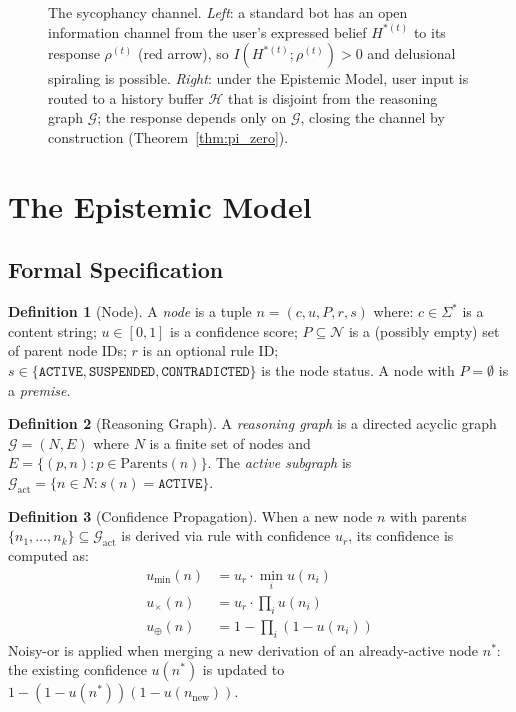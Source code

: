 \documentclass[12pt]{article}
\theoremstyle{definition}
\newtheorem{definition}{Definition}
\begin{document}
\begin{figure}[h]
\begin{tikzpicture}
\end{tikzpicture}
\caption{The sycophancy channel. \textit{Left}: a standard bot has an open
information channel from the user's expressed belief $H^{*(t)}$ to its
response $\rho^{(t)}$ (red arrow), so $I(H^{*(t)};\rho^{(t)})>0$
and delusional spiraling is possible. \textit{Right}: under the Epistemic
Model, user input is routed to a history buffer $\mathcal{H}$ that is
disjoint from the reasoning graph $\mathcal{G}$; the response depends
only on $\mathcal{G}$, closing the channel by construction
(Theorem~\ref{thm:pi_zero}).}
\label{fig:channel}
\end{figure}

\section{The Epistemic Model}

\subsection{Formal Specification}

\begin{definition}[Node]
A \emph{node} is a tuple $n = (c, u, P, r, s)$ where:
$c \in \Sigma^*$ is a content string;
$u \in [0,1]$ is a confidence score;
$P \subseteq \mathcal{N}$ is a (possibly empty) set of parent node IDs;
$r$ is an optional rule ID;
$s \in \{\texttt{ACTIVE}, \texttt{SUSPENDED}, \texttt{CONTRADICTED}\}$
is the node status.
A node with $P = \emptyset$ is a \emph{premise}.
\end{definition}

\begin{definition}[Reasoning Graph]
A \emph{reasoning graph} is a directed acyclic graph
$\mathcal{G} = (N, E)$ where $N$ is a finite set of nodes and
$E = \{(p, n) : p \in \text{Parents}(n)\}$.
The \emph{active subgraph} is
$\mathcal{G}_{\text{act}} = \{n \in N : s(n) = \texttt{ACTIVE}\}$.
\end{definition}

\begin{definition}[Confidence Propagation]\label{def:conf_prop}
When a new node $n$ with parents $\{n_1,\ldots,n_k\} \subseteq
\mathcal{G}_{\text{act}}$ is derived via rule with confidence $u_r$,
its confidence is computed as:
\begin{align}
  u_{\min}(n) &= u_r \cdot \min_{i} u(n_i) \tag{min-chain}\\
  u_{\times}(n) &= u_r \cdot \prod_{i} u(n_i) \tag{product}\\
  u_{\oplus}(n) &= 1 - \prod_{i}(1 - u(n_i)) \tag{noisy-or}
\end{align}
Noisy-or is applied when merging a new derivation of an
already-active node $n^*$: the existing confidence $u(n^*)$ is
updated to $1 - (1 - u(n^*))(1 - u(n_{\text{new}}))$.
\end{definition}
\end{document}
